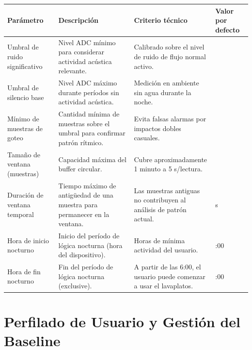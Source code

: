 \documentclass[12pt,a4paper]{article}
\begin{document}
\begin{center}
\begin{tabularx}{0.95\textwidth}{lXX>{\ttfamily}l}
    \toprule
    \textbf{Parámetro} & \textbf{Descripción} & \textbf{Criterio técnico} & \textbf{Valor por defecto} \\
    \midrule
    Umbral de ruido significativo &
        Nivel ADC mínimo para considerar actividad acústica relevante. &
        Calibrado sobre el nivel de ruido de flujo normal activo. &
        1500 \\
    \addlinespace
    Umbral de silencio base &
        Nivel ADC máximo durante períodos sin actividad acústica. &
        Medición en ambiente sin agua durante la noche. &
        800 \\
    \addlinespace
    Mínimo de muestras de goteo &
        Cantidad mínima de muestras sobre el umbral para confirmar patrón rítmico. &
        Evita falsas alarmas por impactos dobles casuales. &
        3 \\
    \addlinespace
    Tamaño de ventana (muestras) &
        Capacidad máxima del buffer circular. &
        Cubre aproximadamente 1 minuto a 5 s/lectura. &
        12 \\
    \addlinespace
    Duración de ventana temporal &
        Tiempo máximo de antigüedad de una muestra para permanecer en la ventana. &
        Las muestras antiguas no contribuyen al análisis de patrón actual. &
        60 s \\
    \addlinespace
    Hora de inicio nocturno &
        Inicio del período de lógica nocturna (hora del dispositivo). &
        Horas de mínima actividad del usuario. &
        0:00 \\
    \addlinespace
    Hora de fin nocturno &
        Fin del período de lógica nocturna (exclusive). &
        A partir de las 6:00, el usuario puede comenzar a usar el lavaplatos. &
        6:00 \\
    \bottomrule
\end{tabularx}
\end{center}

\section{Perfilado de Usuario y Gestión del Baseline}
\end{document}
